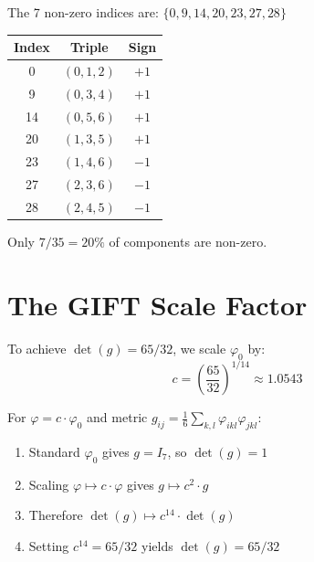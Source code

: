 \begin{theorem}\label{thm:nonzero_indices}
    \leanok
    The 7 non-zero indices are: $\{0, 9, 14, 20, 23, 27, 28\}$

    \begin{center}
    \begin{tabular}{|c|c|c|}
    \hline
    \textbf{Index} & \textbf{Triple} & \textbf{Sign} \\
    \hline
    0 & $(0,1,2)$ & $+1$ \\
    9 & $(0,3,4)$ & $+1$ \\
    14 & $(0,5,6)$ & $+1$ \\
    20 & $(1,3,5)$ & $+1$ \\
    23 & $(1,4,6)$ & $-1$ \\
    27 & $(2,3,6)$ & $-1$ \\
    28 & $(2,4,5)$ & $-1$ \\
    \hline
    \end{tabular}
    \end{center}
\end{theorem}

\begin{theorem}[Sparsity]\label{thm:phi0_sparse}
    \leanok
    Only $7/35 = 20\%$ of components are non-zero.
\end{theorem}

\section{The GIFT Scale Factor}

\begin{definition}\label{def:scale_c}
    \leanok
    To achieve $\det(g) = 65/32$, we scale $\varphi_0$ by:
    \[
        c = \left(\frac{65}{32}\right)^{1/14} \approx 1.0543
    \]
\end{definition}

\begin{theorem}\label{thm:scale_derivation}
    \leanok
    For $\varphi = c \cdot \varphi_0$ and metric $g_{ij} = \frac{1}{6}\sum_{k,l} \varphi_{ikl}\varphi_{jkl}$:
    \begin{enumerate}
        \item Standard $\varphi_0$ gives $g = I_7$, so $\det(g) = 1$
        \item Scaling $\varphi \mapsto c \cdot \varphi$ gives $g \mapsto c^2 \cdot g$
        \item Therefore $\det(g) \mapsto c^{14} \cdot \det(g)$
        \item Setting $c^{14} = 65/32$ yields $\det(g) = 65/32$
    \end{enumerate}
\end{theorem}

